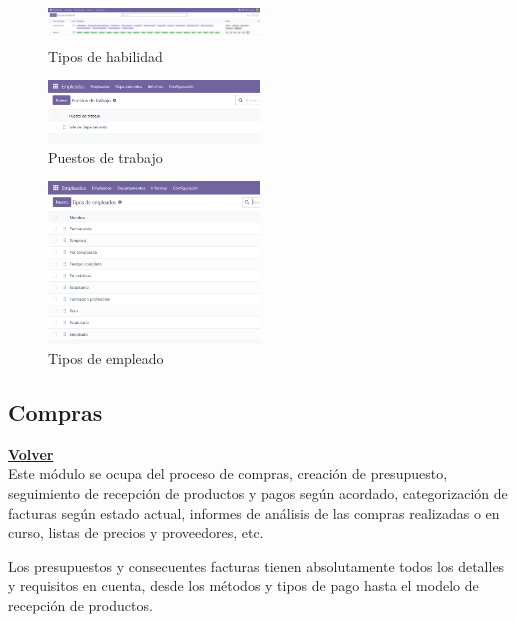 \documentclass[a4paper,12pt]{article}
\begin{document}
\begin{figure}[h!]
    \centering
    \includegraphics[width=0.5\textwidth]{pr2odoo24-tiposHabilidad.png}
    \caption{Tipos de habilidad}
\end{figure}
\FloatBarrier

\begin{figure}[h!]
    \centering
    \includegraphics[width=0.5\textwidth]{pr2odoo25-puestosTrabajo.png}
    \caption{Puestos de trabajo}
\end{figure}
\FloatBarrier

\begin{figure}[h!]
    \centering
    \includegraphics[width=0.5\textwidth]{pr2odoo26-tiposEmpleado.png}
    \caption{Tipos de empleado}
\end{figure}
\FloatBarrier


\subsection{Compras}
\hyperlink{anchor-indice}{\textbf{Volver}}\\

Este módulo se ocupa del proceso de compras, creación de presupuesto, seguimiento de recepción de productos y pagos según acordado, categorización de facturas según estado actual, informes de análisis de las compras realizadas o en curso, listas de precios y proveedores, etc.

Los presupuestos y consecuentes facturas tienen absolutamente todos los detalles y requisitos en cuenta, desde los métodos y tipos de pago hasta el modelo de recepción de productos.
\end{document}
